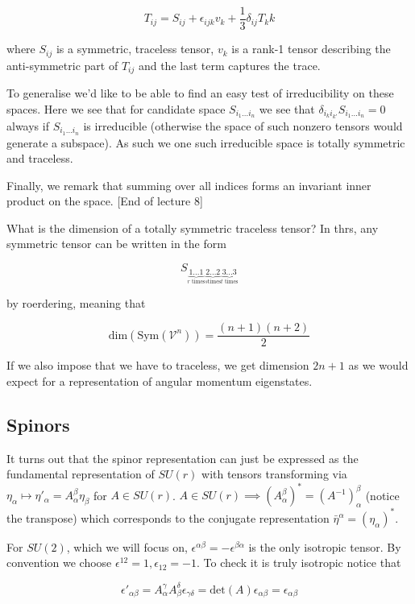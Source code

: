 \documentclass{article}
\theoremstyle{definition}
\begin{document}
$$ T_{ij} = S_{ij} + \epsilon_{ijk} v_k + \frac{1}{3} \delta_{ij} T_kk $$

where $S_{ij}$ is a symmetric, traceless tensor, $v_k$ is a rank-1 tensor
describing the anti-symmetric part of $T_{ij}$ and the last term captures the
trace.

To generalise we'd like to be able to find an easy test of irreducibility on
these spaces. Here we see that for candidate space $S_{i_1 \dots i_n}$ we see
that $\delta_{i_k i_{k'}} S_{i_1 \dots i_n} = 0$ always if $S_{i_1 \dots i_n}$
is irreducible (otherwise the space of such nonzero tensors would generate a
subspace). As such we one such irreducible space is totally symmetric and
traceless. 

Finally, we remark that summing over all indices forms an invariant inner
product on the space. [End of lecture 8] 

What is the dimension of a totally symmetric traceless tensor? In thrs, any
symmetric tensor can be written in the form

$$ S_{\underbrace{1 \dots 1}_{r \text{ times}} \underbrace{2 \dots 2}_{s \text{
      times}} \underbrace{3 \dots 3}_{t \text{ times}}} $$

by roerdering, meaning that

$$ \text{dim}(\text{Sym}(\mathcal{V}^n)) = \frac{(n + 1)(n + 2)}{2} $$

If we also impose that we have to traceless, we get dimension $2n + 1$ as we
would expect for a representation of angular momentum eigenstates. 

\subsection{Spinors}

It turns out that the spinor representation can just be expressed as the
fundamental representation of $SU(r)$ with tensors transforming via $\eta_\alpha
\mapsto \eta'_\alpha = A_\alpha^\beta \eta_\beta$ for $A \in SU(r)$. $A \in
SU(r) \implies (A_\alpha^\beta)^* = (A^{-1})_\alpha^\beta$ (notice the
transpose) which corresponds to the conjugate representation $\bar{\eta}^\alpha
= (\eta_\alpha)^*$.

For $SU(2)$, which we will focus on, $\epsilon^{\alpha \beta} = -\epsilon^{\beta
\alpha}$ is the only isotropic tensor. By convention we choose $\epsilon^{12} =
1, \epsilon_{12} = -1$. To check it is truly isotropic notice that

$$ \epsilon'_{\alpha \beta} = A_\alpha^\gamma A_\beta^\delta \epsilon_{\gamma
  \delta} = \text{det}(A) \epsilon_{\alpha \beta} = \epsilon_{\alpha \beta} $$
\end{document}
